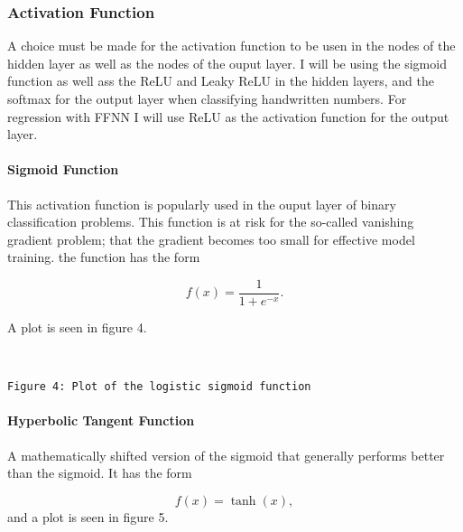\documentclass[11pt]{article}
\begin{document}
    \hypertarget{activation-function}{%
\subsubsection{Activation Function}\label{activation-function}}

A choice must be made for the activation function to be usen in the
nodes of the hidden layer as well as the nodes of the ouput layer. I
will be using the sigmoid function as well ass the ReLU and Leaky ReLU
in the hidden layers, and the softmax for the output layer when
classifying handwritten numbers. For regression with FFNN I will use
ReLU as the activation function for the output layer.

\hypertarget{sigmoid-function}{%
\paragraph{Sigmoid Function}\label{sigmoid-function}}

This activation function is popularly used in the ouput layer of binary
classification problems. This function is at risk for the so-called
vanishing gradient problem; that the gradient becomes too small for
effective model training. the function has the form

\[
f(x) = \frac{1}{1 + e^{-x}}.
\] 

A plot is seen in figure 4.

    \begin{center}
    \end{center}
    { \hspace*{\fill} \\}
    
    \begin{Verbatim}[commandchars=\\\{\}]
Figure 4: Plot of the logistic sigmoid function
    \end{Verbatim}

    \hypertarget{hyperbolic-tangent-function}{%
\paragraph{Hyperbolic Tangent
Function}\label{hyperbolic-tangent-function}}

A mathematically shifted version of the sigmoid that generally performs
better than the sigmoid. It has the form

\[
f(x) = \tanh(x),
\] and a plot is seen in figure 5.
\end{document}
